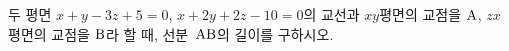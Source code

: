 두 평면 $x+y-3z+5=0$, $x+2y+2z-10=0$의 교선과 $xy$평면의 교점을 $\mathrm{A}$, $zx$평면의 교점을 $\mathrm{B}$라 할 때, 선분~$\mathrm{AB}$의 길이를 구하시오.
